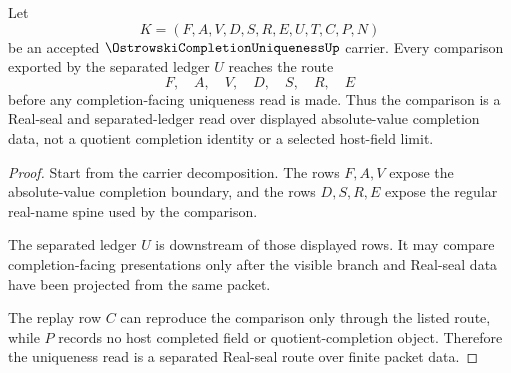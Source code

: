\begin{theorem}
\label{thm:ostrowski-completion-uniqueness-real-seal}
Let
$$
K=(F,A,V,D,S,R,E,U,T,C,P,N)
$$
be an accepted $\OstrowskiCompletionUniquenessUp$ carrier. Every comparison exported by the separated ledger $U$ reaches the route
$$
F,\quad A,\quad V,\quad D,\quad S,\quad R,\quad E
$$
before any completion-facing uniqueness read is made. Thus the comparison is a Real-seal and separated-ledger read over displayed absolute-value completion data, not a quotient completion identity or a selected host-field limit.
\end{theorem}
\begin{proof}
Start from the carrier decomposition. The rows $F,A,V$ expose the absolute-value completion boundary, and the rows $D,S,R,E$ expose the regular real-name spine used by the comparison.

The separated ledger $U$ is downstream of those displayed rows. It may compare completion-facing presentations only after the visible branch and Real-seal data have been projected from the same packet.

The replay row $C$ can reproduce the comparison only through the listed route, while $P$ records no host completed field or quotient-completion object. Therefore the uniqueness read is a separated Real-seal route over finite packet data.
\end{proof}




